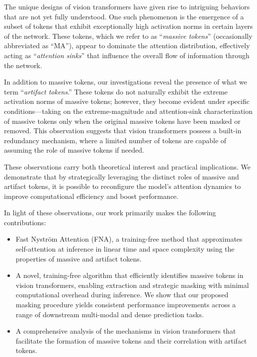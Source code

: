 \documentclass[10pt,twocolumn,letterpaper]{article}
\begin{document}
The unique designs of vision transformers have given rise to intriguing behaviors that are not yet fully understood. One such phenomenon is the emergence of a subset of tokens that exhibit exceptionally high activation norms in certain layers of the network. These tokens, which we refer to as ``\textit{massive tokens}'' (occasionally abbreviated as ``MA''), appear to dominate the attention distribution, effectively acting as ``\textit{attention sinks}'' \cite{gu2024attnsink} that influence the overall flow of information through the network.

In addition to massive tokens, our investigations reveal the presence of what we term ``\textit{artifact tokens}.'' These tokens do not naturally exhibit the extreme activation norms of massive tokens; however, they become evident under specific conditions---taking on the extreme-magnitude and attention-sink characterization of massive tokens only when the original massive tokens have been masked or removed. This observation suggests that vision transformers possess a built-in redundancy mechanism, where a limited number of tokens are capable of assuming the role of massive tokens if needed. 

These observations carry both theoretical interest and practical implications. We demonstrate that by strategically leveraging the distinct roles of massive and artifact tokens, it is possible to reconfigure the model’s attention dynamics to improve computational efficiency and boost performance.

In light of these observations, our work primarily makes the following contributions:
\begin{itemize}
    \item Fast Nystr\"om Attention (FNA), a training-free method that approximates self-attention at inference in linear time and space complexity using the properties of massive and artifact tokens.
    \vspace{-0.2cm}
    \item A novel, training-free algorithm that efficiently identifies massive tokens in vision transformers, enabling extraction and strategic masking with minimal computational overhead during inference. We show that our proposed masking procedure yields consistent performance improvements across a range of downstream multi-modal and dense prediction tasks.
    \vspace{-0.2cm}
    \item A comprehensive analysis of the mechanisms in vision transformers that facilitate the formation of massive tokens and their correlation with artifact tokens.
\end{itemize}
\end{document}

